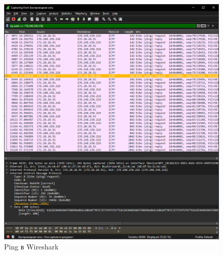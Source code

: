 \begin{figure}[h]
    \centering
    \includegraphics[width=1\linewidth]{res/ping-wireshark.png}
    \caption{Ping в Wireshark}
    \label{fig:ping-wireshark}
\end{figure}

